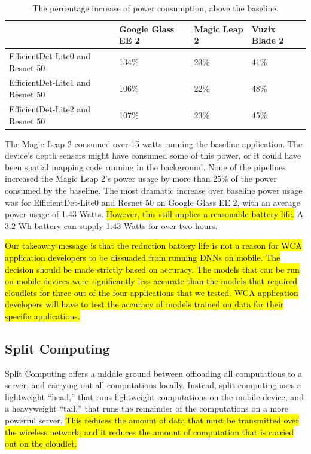 \begin{table}
\begin{tabular}{|l||l|l|l|}
  \hline
  & Google Glass EE 2 & Magic Leap 2 & Vuzix Blade 2\\
  \hline
  \hline
  EfficientDet-Lite0 and Resnet 50 & 134\% & 23\% & 41\%\\
  EfficientDet-Lite1 and Resnet 50 & 106\% & 22\% & 48\%\\
  EfficientDet-Lite2 and Resnet 50 & 107\% & 23\% & 45\%\\
  \hline
\end{tabular}
  \caption{
    The percentage increase of power consumption, above the baseline.
  }\label{tab:mobile_power_pi}
\end{table}

The Magic Leap 2 consumed over 15 watts running the baseline application.
The device's depth sensors might have consumed some of this power, or it could
have been spatial mapping code running in the background.
None of the pipelines increased the Magic Leap 2's power usage by more than 25\%
of the power consumed by the baseline.
The most dramatic increase over baseline power usage was for EfficientDet-Lite0
and Resnet 50 on Google Glass EE 2, with an average power usage of 1.43 Watts.
\hl{
  However, this still implies a reasonable battery life.
}
A 3.2 Wh battery can supply 1.43 Watts for over two hours.

\hl{
  Our takeaway message is that the reduction battery life is not a reason for
  WCA application developers to be dissuaded from running DNNs on mobile.
  The decision should be made strictly based on accuracy.
  The models that can be run on mobile devices were significantly less
  accurate than the models that required cloudlets for three out of the four
  applications that we tested.
  WCA application developers will have to test the accuracy of models trained
  on data for their specific applications.
}

\subsection{Split Computing}

Split Computing offers a middle ground between offloading all computations to a
server, and carrying out all computations locally.
Instead, split computing uses a lightweight ``head,'' that runs lightweight
computations on the mobile device, and a heavyweight ``tail,'' that runs the
remainder of the computations on a more powerful server.
\hl{
  This reduces the amount of data that must be transmitted over the wireless
  network, and it reduces the amount of computation that is carried out on the
  cloudlet.
}

